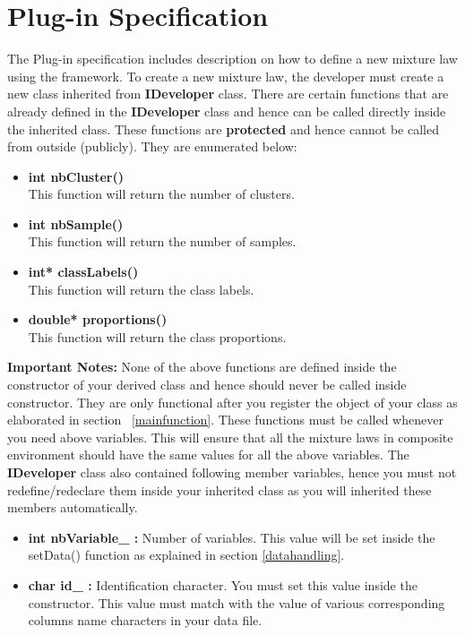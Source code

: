 \documentclass[a4paper,11pt]{article}
\begin{document}
\section{Plug-in Specification}

The Plug-in specification includes description on how to define a new mixture law using the framework.
To create a new mixture law, the developer 
must create a new class inherited from {\bf IDeveloper} class.
There are certain functions that are already defined in the {\bf IDeveloper} 
class and hence can be called directly inside the inherited class. These functions are {\bf protected} and hence cannot be called from outside (publicly). 
They are enumerated below:
\begin{itemize}
 \item {\bf int nbCluster()}\\
This function will return the number of clusters.
 \item {\bf int nbSample()}\\
This function will return the number of samples.
\item {\bf int* classLabels()}\\
This function will return the class labels.
\item {\bf double* proportions()}\\
This function will return the class proportions.
\end{itemize}
{\bf Important Notes:} None of the above functions are defined inside the constructor of your derived class and hence should
never be called inside constructor. They are only functional after you register the object of your class as elaborated in 
section ~\ref{mainfunction}. These functions must be called whenever you need above variables. This will ensure that 
all the mixture laws in composite environment should have the same
values for all the above variables.
The {\bf IDeveloper} class also contained following member variables, hence you must not redefine/redeclare them 
inside your inherited class as you will inherited these members automatically.
\begin{itemize}
\item {\bf int nbVariable\_ : }Number of variables. This value will be set inside the setData() function as explained in section \ref{datahandling}. 
\item {\bf char id\_ : }Identification character. You must set this value inside the constructor. This value 
must match with the value of various corresponding columns name characters
in your data file.
\end{itemize}
\end{document}
